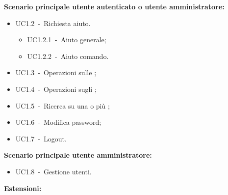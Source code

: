 \documentclass{scalatekids-article}
\begin{document}
\textbf{Scenario principale utente autenticato o utente amministratore:}
\begin{itemize}
\item UC1.2\ -\ Richiesta aiuto.
  \begin{itemize}
  \item UC1.2.1\ -\ Aiuto generale;
  \item UC1.2.2\ -\ Aiuto comando.
  \end{itemize}
\item UC1.3\ -\ Operazioni sulle ;
\item UC1.4\ -\ Operazioni sugli ;
\item UC1.5\ -\ Ricerca su una o più ;
\item UC1.6\ -\ Modifica password;
\item UC1.7\ -\ Logout.
\end{itemize}
\textbf{Scenario principale utente amministratore:}
\begin{itemize}
\item UC1.8\ -\ Gestione utenti.
\end{itemize}
\textbf{Estensioni:}
\end{document}
